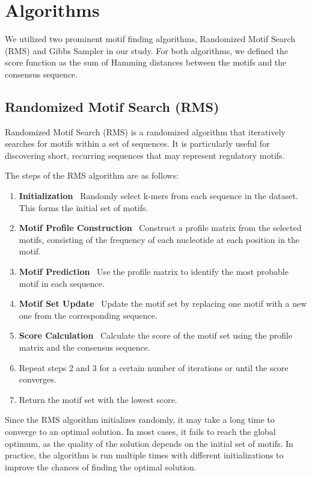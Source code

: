 \section{Algorithms}

We utilized two prominent motif finding algorithms, Randomized Motif Search (RMS) and Gibbs Sampler in our study. For both algorithms, we defined the score function as the sum of Hamming distances between the motifs and the consensus sequence.

\subsection{Randomized Motif Search (RMS)}

Randomized Motif Search (RMS) is a randomized algorithm that iteratively searches for motifs within a set of sequences. It is particularly useful for discovering short, recurring sequences that may represent regulatory motifs.

The steps of the RMS algorithm are as follows:

\begin{enumerate}
	\item \textbf{Initialization} \ Randomly select k-mers from each sequence in the dataset. This forms the initial set of motifs.
	\item \textbf{Motif Profile Construction} \ Construct a profile matrix from the selected motifs, consisting of the frequency of each nucleotide at each position in the motif.
	\item \textbf{Motif Prediction} \ Use the profile matrix to identify the most probable motif in each sequence.
	\item \textbf{Motif Set Update} \ Update the motif set by replacing one motif with a new one from the corresponding sequence.
	\item \textbf{Score Calculation} \ Calculate the score of the motif set using the profile matrix and the consensus sequence.
	\item Repeat steps 2 and 3 for a certain number of iterations or until the score converges.
	\item Return the motif set with the lowest score.
\end{enumerate}

Since the RMS algorithm initializes randomly, it may take a long time to converge to an optimal solution. In most cases, it fails to reach the global optimum, as the quality of the solution depends on the initial set of motifs. In practice, the algorithm is run multiple times with different initializations to improve the chances of finding the optimal solution.

